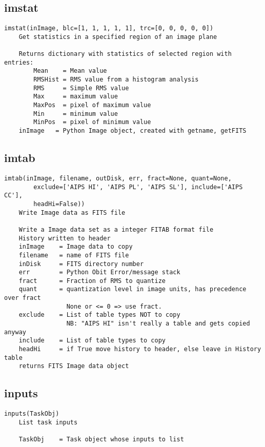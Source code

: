 \documentclass[11pt]{report}
\begin{document}
\subsection{imstat}
\begin{verbatim}
imstat(inImage, blc=[1, 1, 1, 1, 1], trc=[0, 0, 0, 0, 0])
    Get statistics in a specified region of an image plane
    
    Returns dictionary with statistics of selected region with entries:
        Mean    = Mean value
        RMSHist = RMS value from a histogram analysis
        RMS     = Simple RMS value
        Max     = maximum value
        MaxPos  = pixel of maximum value
        Min     = minimum value
        MinPos  = pixel of minimum value
    inImage   = Python Image object, created with getname, getFITS
\end{verbatim}

\subsection{imtab}
\begin{verbatim}
imtab(inImage, filename, outDisk, err, fract=None, quant=None, 
        exclude=['AIPS HI', 'AIPS PL', 'AIPS SL'], include=['AIPS CC'],
        headHi=False))
    Write Image data as FITS file
    
    Write a Image data set as a integer FITAB format file
    History written to header
    inImage    = Image data to copy
    filename   = name of FITS file
    inDisk     = FITS directory number
    err        = Python Obit Error/message stack
    fract      = Fraction of RMS to quantize
    quant      = quantization level in image units, has precedence over fract
                 None or <= 0 => use fract.
    exclude    = List of table types NOT to copy
                 NB: "AIPS HI" isn't really a table and gets copied anyway
    include    = List of table types to copy
    headHi     = if True move history to header, else leave in History table
    returns FITS Image data object
\end{verbatim}

\subsection{inputs}
\begin{verbatim}
inputs(TaskObj)
    List task inputs
    
    TaskObj    = Task object whose inputs to list
\end{verbatim}
\end{document}

